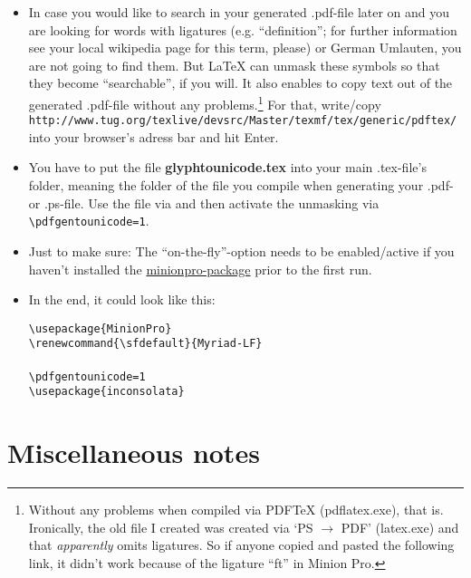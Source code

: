 \begin{itemize}
	\item In case you would like to search in your generated .pdf-file later on and you are looking for words with ligatures (e.g. ``definition''; for further information see your local wikipedia page for this term, please) or German Umlauten, you are not going to find them. But \LaTeX{} can unmask these symbols so that they become ``searchable'', if you will. It also enables to copy text out of the generated .pdf-file without any problems.\footnote{Without any problems when compiled via PDF\TeX{} (pdflatex.exe), that is. Ironically, the old file I created was created via `PS $\rightarrow$ PDF' (latex.exe) and that \emph{apparently} omits ligatures. So if anyone copied and pasted the following link, it didn't work because of the ligature ``ft'' in Minion Pro.} For that, write/copy\\
	\verb+http://www.tug.org/texlive/devsrc/Master/texmf/tex/generic/pdftex/+\\
	into your browser's adress bar and hit Enter.

	\item You have to put the file \textbf{glyphtounicode.tex} into your main .tex-file's folder, meaning the folder of the file you compile when generating your .pdf- or .ps-file. Use the file via \verb++ and then activate the unmasking via \verb+\pdfgentounicode=1+.
	\item Just to make sure: The ``on-the-fly''-option needs to be enabled/active if you haven't installed the \href{http://ctan.org/pkg/minionpro}{minionpro-package} prior to the first run.
	\item In the end, it could look like this:
	\begin{center}\begin{minipage}[t]{8cm}
	\begin{flushleft}
	\verb+\usepackage{MinionPro}+\\
	\verb+\renewcommand{\sfdefault}{Myriad-LF}+\\
	\verb++\\
	\verb+\pdfgentounicode=1+\\
	\verb+\usepackage{inconsolata}+
	\end{flushleft}
	\end{minipage}\end{center}
\end{itemize}

\section{Miscellaneous notes}

